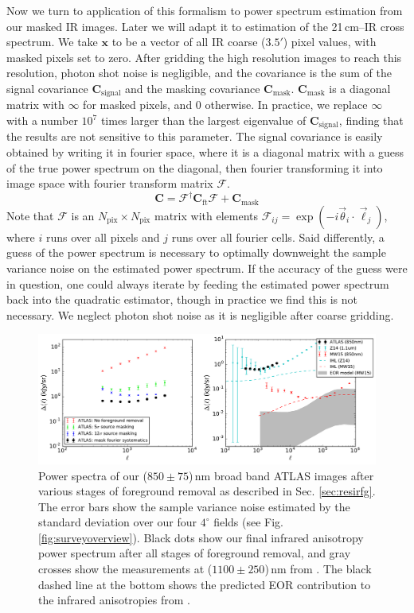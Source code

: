 \documentclass{emulateapj}
\newcommand{\Cb}{\mathbf{C}}
\newcommand{\xb}{\mathbf{x}}
\begin{document}
Now we turn to application of this formalism to power spectrum estimation from our masked IR images. Later we will adapt it to estimation of the 21\,cm--IR cross spectrum. We take $\xb$ to be a vector of all IR coarse ($3.5'$) pixel values, with masked pixels set to zero. After gridding the high resolution images to reach this resolution, photon shot noise is negligible, and the covariance is the sum of the signal covariance $\Cb_\text{signal}$ and the masking covariance $\Cb_\text{mask}$. $\Cb_\text{mask}$ is a diagonal matrix with $\infty$ for masked pixels, and 0 otherwise. In practice, we replace $\infty$ with a number $10^7$ times larger than the largest eigenvalue of $\Cb_\text{signal}$, finding that the results are not sensitive to this parameter. The signal covariance is easily obtained by writing it in fourier space, where it is a diagonal matrix with a guess of the true power spectrum on the diagonal, then fourier transforming it into image space with fourier transform matrix $\mathcal{F}$. 
\begin{equation}
\label{eqn:covFTwithmask}
	\Cb = \mathcal{F}^\dagger\Cb_\text{ft}\mathcal{F}+\Cb_\text{mask}
\end{equation}
Note that $\mathcal{F}$ is an $N_\text{pix}\times N_\text{pix}$ matrix with elements $\mathcal{F}_{ij}=\exp(-i \vec{\theta}_i\cdot\vec{\ell}_j)$, where $i$ runs over all pixels and $j$ runs over all fourier cells. Said differently, a guess of the power spectrum is necessary to optimally downweight the sample variance noise on the estimated power spectrum. If the accuracy of the guess were in question, one could always iterate by feeding the estimated power spectrum back into the quadratic estimator, though in practice we find this is not necessary. We neglect photon shot noise as it is negligible after coarse gridding. 

\begin{figure}[h]
\centering
\includegraphics[width=7in]{images/big_foreground_masking_study_pspecs_2_magoffset=20_56+0_274.pdf}
\caption{Power spectra of our ($850\pm75$)\,nm broad band ATLAS images after various stages of foreground removal as described in Sec. \ref{sec:resirfg}. The error bars show the sample variance noise estimated by the standard deviation over our four $4^\circ$ fields (see Fig. \ref{fig:surveyoverview}). Black dots show our final infrared anisotropy power spectrum after all stages of foreground removal, and gray crosses show the measurements at ($1100\pm250$)\,nm from \citet{zemcov14}. The black dashed line at the bottom shows the predicted EOR contribution to the infrared anisotropies from \citet{zemcov14}.}
\label{fig:bigfgmaskingstudypspecs}
\end{figure}
\end{document}
